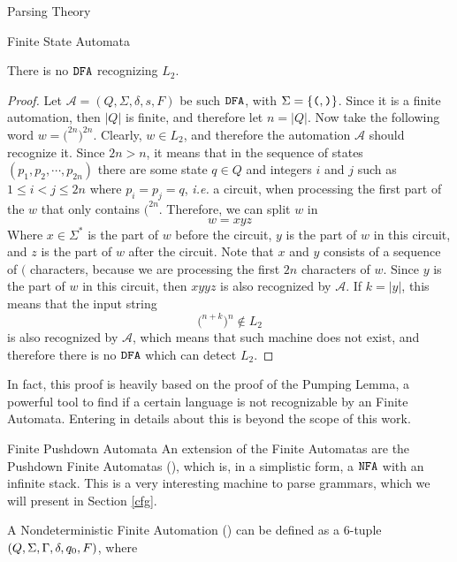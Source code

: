 \begin{section}{Parsing Theory}
\begin{subsection}{Finite State Automata}
\begin{lemma}
There is no $\texttt{DFA}$ recognizing $L_2$.
\end{lemma}
\begin{proof}
Let $\mathcal{A} = (Q, \Sigma, \delta, s, F)$ be such $\texttt{DFA}$,
with $\Sigma = \{\texttt{(}, \texttt{)}\}$.
Since it is a finite automation, then $|Q|$ is finite, and therefore let
$n = |Q|$. Now take the following word $w = \texttt{(}^{2n}\texttt{)}^{2n}$.
Clearly, $w \in L_2$, and therefore the automation $\mathcal{A}$ should
recognize it. Since $2n > n$, it means that in the sequence of states
$(p_1, p_2, \cdots, p_{2n})$ there are some state $q \in Q$ and integers
$i$ and $j$ such as $1 \leq i < j \leq 2n$ where $p_i = p_j = q$,
\textit{i.e.} a circuit, when processing the first part of the $w$
that only contains $\texttt{(}^{2n}$. Therefore, we can split
$w$ in 
$$w = xyz $$
Where $x \in \Sigma^*$ is the part of $w$ before the circuit, $y$ is
the part of $w$ in this circuit, and $z$ is the part of $w$ after the
circuit. Note that $x$ and $y$ consists of a sequence of $\texttt{(}$
characters, because we are processing the first $2n$ characters of $w$.
Since $y$ is the part of $w$ in this circuit, then
$ xyyz $
is also recognized by $\mathcal{A}$. If $k = |y|$, this means that
the input string
$$ \texttt{(}^{n+k}\texttt{)}^n \not\in L_2$$
is also recognized by $\mathcal{A}$, which means that such machine does
not exist, and therefore there is no $\texttt{DFA}$ which can detect
$L_2$.
\end{proof}

In fact, this proof is heavily based on the proof of the Pumping Lemma,
a powerful tool to find if a certain language is not recognizable by an
Finite Automata. Entering in details about this is beyond the scope of
this work.

\end{subsection}

\begin{subsection}{Finite Pushdown Automata}
	An extension of the Finite Automatas are the Pushdown Finite Automatas
	(), which is, in a simplistic form, a $\texttt{NFA}$
	with an infinite stack. This is a very interesting machine to
	parse grammars, which we will present in Section \ref{cfg}.

\begin{definition}
A Nondeterministic Finite Automation () can be defined as a 6-tuple
$(Q, \Sigma, \Gamma, \delta, q_0, F)$, where
\begin{itemize}


\end{itemize}
\end{definition}
\end{subsection}
\end{section}
